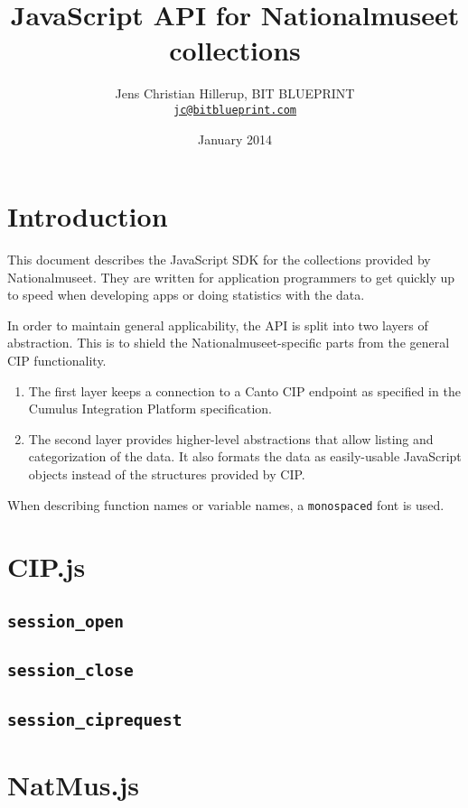 \documentclass{article}
\title{JavaScript API for Nationalmuseet collections}
\author{Jens Christian Hillerup, BIT BLUEPRINT\\ \href{mailto:jc@bitblueprint.com}{\tt jc@bitblueprint.com}}
\date{January 2014}
\begin{document}
\maketitle

\tableofcontents

\section{Introduction}
This document describes the JavaScript SDK for the collections provided by Nationalmuseet. They are written for application programmers to get quickly up to speed when developing apps or doing statistics with the data. 

In order to maintain general applicability, the API is split into two layers of abstraction. This is to shield the Nationalmuseet-specific parts from the general CIP functionality.
\begin{enumerate}
\item{The first layer keeps a connection to a Canto CIP endpoint as specified in the Cumulus Integration Platform specification.}
\item{The second layer provides higher-level abstractions that allow listing and categorization of the data. It also formats the data as easily-usable JavaScript objects instead of the structures provided by CIP.}
\end{enumerate}

When describing function names or variable names, a \texttt{monospaced} font is used.

\section{CIP.js}

\subsection{\tt session\_open}

\subsection{\tt session\_close}

\subsection{\tt session\_ciprequest}

\section{NatMus.js}
\end{document}
